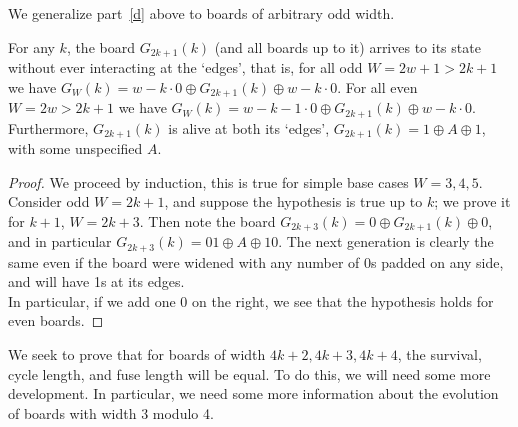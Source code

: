 \documentclass[12pt,letterpaper]{article}
\begin{document}
\noindent We generalize part~\ref{d} above to boards of arbitrary odd width.
\begin{prop} \label{OddBoardFirstEdge} %
  For any $k$, the board $G_{2k+1}(k)$ (and all boards up to it) arrives to its state without ever interacting at the `edges', that is, for all odd $W=2w+1>2k+1$ we have $G_W(k) = w-k \cdot 0 \oplus G_{2k+1}(k)\oplus w-k\cdot 0$. For all even $W=2w>2k+1$ we have $G_W(k) = w-k-1\cdot 0 \oplus G_{2k+1}(k)\oplus w-k\cdot 0$. \\
  Furthermore, $G_{2k+1}(k)$ is alive at both its `edges', $G_{2k+1}(k)=1\oplus A\oplus 1$, with some unspecified $A$.
\end{prop}
\begin{proof}
  We proceed by induction, this is true for simple base cases $W=3,4,5$. Consider odd $W=2k+1$, and suppose the hypothesis is true up to $k$; we prove it for $k+1$, $W=2k+3$. Then note the board $G_{2k+3}(k)=0\oplus G_{2k+1}(k)\oplus 0$, and in particular $G_{2k+3}(k)=01\oplus A\oplus 10$. The next generation is clearly the same even if the board were widened with any number of 0s padded on any side, and will have 1s at its edges. \\
  In particular, if we add one 0 on the right, we see that the hypothesis holds for even boards.
\end{proof}

We seek to prove that for boards of width $4k+2, 4k+3, 4k+4$, the survival, cycle length, and fuse length will be equal. To do this, we will need some more development. In particular, we need some more information about the evolution of boards with width 3 modulo 4.
\end{document}
